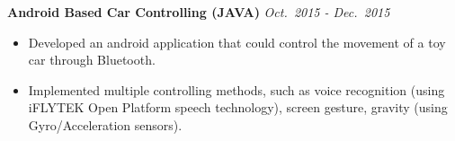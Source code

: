 \documentclass[10pt]{article}
\newenvironment{changemargin}[2]{%
  \begin{list}{}{%
    \setlength{\topsep}{0pt}%
    \setlength{\leftmargin}{#1}%
    \setlength{\rightmargin}{#2}%
    \setlength{\listparindent}{\parindent}%
    \setlength{\itemindent}{\parindent}%
    \setlength{\parsep}{\parskip}%
  }%
  \item[]}{\end{list}
}
\newenvironment{body} {
	\vspace*{-16pt}
	\begin{changemargin}{-0.65in}{-0.62in}
  }	
	{\end{changemargin}
}
\begin{document}
\begin{body}
	
	  
      
	
	\vspace{-2pt}

	\textbf{Android Based Car Controlling (JAVA)} \hfill \emph{Oct.~2015 - Dec.~2015}
	\vspace*{-5pt}
	\begin{itemize} \itemsep -0pt		
		
	\item Developed an android application that could control the movement of a toy car through Bluetooth.
	\item Implemented multiple controlling methods, such as voice recognition (using iFLYTEK Open Platform speech technology), screen gesture, gravity (using Gyro/Acceleration sensors).		
	\end{itemize}
\vspace{-2pt}
	

\end{body}
\end{document}
